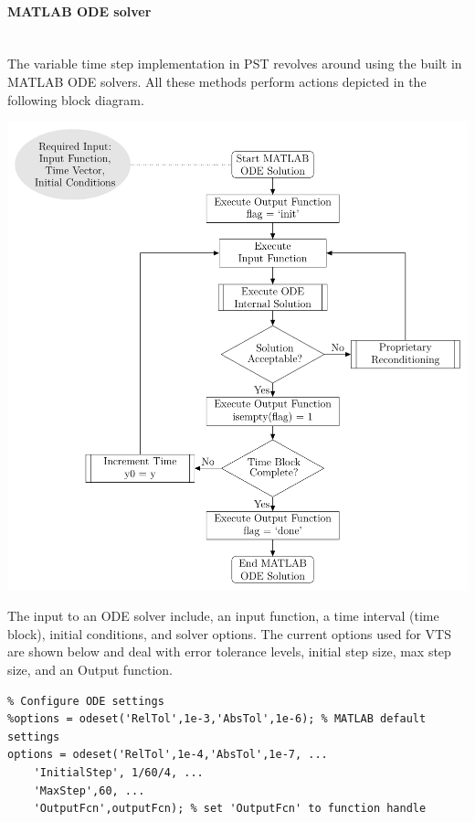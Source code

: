 \documentclass[12pt]{article}
\begin{document}
\pagebreak
\paragraph{MATLAB ODE solver} \ \\
The variable time step implementation in PST revolves around using the built in MATLAB ODE solvers.
All these methods perform actions depicted in the following block diagram.

\begin{center}
\includegraphics[width=.8\linewidth]{./../200804-ODEblockDiagram/200804-ODEblockDiagram}
\end{center}

The input to an ODE solver include, an input function, a time interval (time block), initial conditions, and solver options.
The current options used for VTS are shown below and deal with error tolerance levels, initial step size, max step size, and an Output function.

\begin{verbatim}
% Configure ODE settings
%options = odeset('RelTol',1e-3,'AbsTol',1e-6); % MATLAB default settings
options = odeset('RelTol',1e-4,'AbsTol',1e-7, ...
    'InitialStep', 1/60/4, ...
    'MaxStep',60, ...
    'OutputFcn',outputFcn); % set 'OutputFcn' to function handle
\end{verbatim}

\pagebreak
\end{document}
